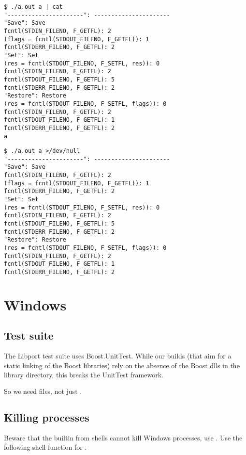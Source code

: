 \documentclass[openright,twoside,11pt]{book}
\begin{document}
\begin{lstlisting}
$ ./a.out a | cat
"----------------------": ----------------------
"Save": Save
fcntl(STDIN_FILENO, F_GETFL): 2
(flags = fcntl(STDOUT_FILENO, F_GETFL)): 1
fcntl(STDERR_FILENO, F_GETFL): 2
"Set": Set
(res = fcntl(STDOUT_FILENO, F_SETFL, res)): 0
fcntl(STDIN_FILENO, F_GETFL): 2
fcntl(STDOUT_FILENO, F_GETFL): 5
fcntl(STDERR_FILENO, F_GETFL): 2
"Restore": Restore
(res = fcntl(STDOUT_FILENO, F_SETFL, flags)): 0
fcntl(STDIN_FILENO, F_GETFL): 2
fcntl(STDOUT_FILENO, F_GETFL): 1
fcntl(STDERR_FILENO, F_GETFL): 2
a
\end{lstlisting}

\begin{lstlisting}
$ ./a.out a >/dev/null
"----------------------": ----------------------
"Save": Save
fcntl(STDIN_FILENO, F_GETFL): 2
(flags = fcntl(STDOUT_FILENO, F_GETFL)): 1
fcntl(STDERR_FILENO, F_GETFL): 2
"Set": Set
(res = fcntl(STDOUT_FILENO, F_SETFL, res)): 0
fcntl(STDIN_FILENO, F_GETFL): 2
fcntl(STDOUT_FILENO, F_GETFL): 5
fcntl(STDERR_FILENO, F_GETFL): 2
"Restore": Restore
(res = fcntl(STDOUT_FILENO, F_SETFL, flags)): 0
fcntl(STDIN_FILENO, F_GETFL): 2
fcntl(STDOUT_FILENO, F_GETFL): 1
fcntl(STDERR_FILENO, F_GETFL): 2
\end{lstlisting}

\section{Windows}

\subsection{Test suite}

The Libport test suite uses Boost.UnitTest.  While our builds (that
aim for a static linking of the Boost libraries) rely on the absence
of the Boost dlls in the library directory, this breaks the UnitTest
framework.

So we need  files, not just
.

\subsection{Killing processes}
\label{sec:win:kill}
Beware that the  builtin from shells cannot kill Windows
processes, use .  Use the following shell function
for .
\end{document}
